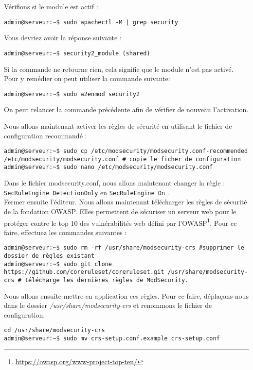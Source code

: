 Vérifions si le module est actif : 
 \begin{verbatim}
admin@serveur:~$ sudo apachectl -M | grep security
\end{verbatim}
Vous devriez avoir la réponse suivante :
\begin{verbatim}
admin@serveur:~$ security2_module (shared)
\end{verbatim}

Si la commande ne retourne rien, cela signifie que le module n'est pas activé. Pour y remédier on peut utiliser la commande suivante:

\begin{verbatim}
admin@serveur:~$ sudo a2enmod security2
\end{verbatim}

On peut relancer la commande précédente afin de vérifier de nouveau l'activation.

Nous allons maintenant activer les règles de sécurité en utilisant le fichier de configuration recommandé : 
 \begin{verbatim}
admin@serveur:~$ sudo cp /etc/modsecurity/modsecurity.conf-recommended /etc/modsecurity/modsecurity.conf # copie le ficher de configuration
admin@serveur:~$ sudo nano /etc/modsecurity/modsecurity.conf
\end{verbatim}
Dans le fichier modsecurity.conf, nous allons maintenant changer la règle : \\ \texttt{SecRuleEngine DetectionOnly} en \texttt{SecRuleEngine On} .\\
Fermer ensuite l'éditeur. Nous allons maintenant télécharger les règles de sécurité de la fondation OWASP. Elles permettent de sécuriser un serveur web pour le protéger contre le top 10 des vulnérabilités web défini par l'OWASP\footnote{\url{https://owasp.org/www-project-top-ten/}}. Pour ce faire, effectuez les commandes suivantes : 
 \begin{verbatim}
admin@serveur:~$ sudo rm -rf /usr/share/modsecurity-crs #supprimer le dossier de règles existant
admin@serveur:~$ sudo git clone https://github.com/coreruleset/coreruleset.git /usr/share/modsecurity-crs # télécharge les dernières règles de ModSecurity. 
\end{verbatim}

Nous allons ensuite mettre en application ces règles. Pour ce faire, déplaçons-nous dans le dossier \emph{/usr/share/modsecurity-crs} et renommons le fichier de configuration.
 \begin{verbatim}
cd /usr/share/modsecurity-crs
admin@serveur:~$ sudo mv crs-setup.conf.example crs-setup.conf
\end{verbatim}

